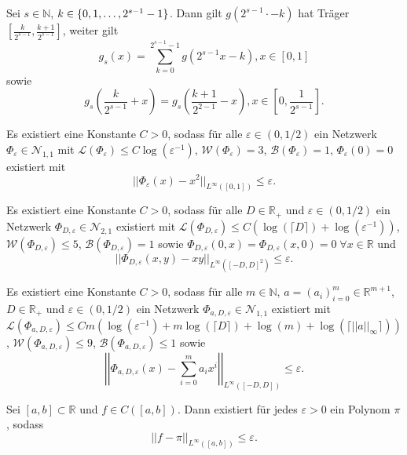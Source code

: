 \documentclass[11pt]{scrartcl}
\newcommand{\N}{\mathbb{N}} %
\newcommand{\R}{\mathbb{R}} %
\begin{document}
\begin{lemma}
	Sei \(s\in\N\), \(k \in \{0,1,\ldots, 2^{s-1}-1\}\). Dann gilt \(g(2^{s-1} \cdot - k)\) 
    hat Träger \([\frac{k}{2^{s-1}}, \frac{k+1}{2^{s-1}}]\), weiter gilt 
    \[ g_s(x) = \sum_{k=0}^{2^{s-1}-1} g(2^{s-1}x - k), x\in [0,1] \]
    sowie 
    \[ g_s(\frac{k}{2^{s-1}}+x) = g_s(\frac{k+1}{2^{2-1}} - x), x \in [0, \frac{1}{2^{s-1}}]. \]
\end{lemma}

\begin{proposition} %
	Es existiert eine Konstante \(C>0\), sodass für alle \(\varepsilon \in (0,1/2)\) 
	ein Netzwerk \(\Phi_\varepsilon \in \mathcal{N}_{1,1}\) mit 
	\(\mathcal{L}(\Phi_\varepsilon) \leq C\log(\varepsilon^{-1})\), 
	\(\mathcal{W}(\Phi_\varepsilon) = 3\), \(\mathcal{B}(\Phi_\varepsilon) = 1\), 
	\(\Phi_\varepsilon(0) = 0\) existiert mit 
	\[ ||\Phi_\varepsilon(x) - x^2 ||_{L^\infty([0,1])} \leq \varepsilon. \]
\end{proposition}

\begin{proposition} %
	Es existiert eine Konstante \(C>0\), sodass für alle \(D\in \R_+\) und \(\varepsilon \in (0, 1/2)\) 
	ein Netzwerk \(\Phi_{D,\varepsilon} \in \mathcal{N}_{2,1}\) existiert mit 
	\(\mathcal{L}(\Phi_{D, \varepsilon}) \leq C (\log(\lceil D \rceil) + \log(\varepsilon^{-1})) \), 
	\(\mathcal{W}(\Phi_{D, \varepsilon}) \leq 5\), \(\mathcal{B}(\Phi_{D, \varepsilon}) = 1\) sowie 
	\(\Phi_{D,\varepsilon}(0,x) = \Phi_{D,\varepsilon}(x,0) = 0 \;\forall x\in \R\) und 
	\[ ||\Phi_{D,\varepsilon}(x,y) - xy||_{L^\infty([-D,D]^2)} \leq \varepsilon. \]
\end{proposition}

\begin{proposition} %
	\newcommand{\Phia}{\Phi_{a,D,\varepsilon}}
	Es existiert eine Konstante \(C>0\), sodass für alle \(m\in \N\), \(a = (a_i)_{i=0}^m \in \R^{m+1}\), 
	\(D\in \R_+\) und \(\varepsilon \in (0,1/2)\) ein Netzwerk \(\Phia \in \mathcal{N}_{1,1}\) 
	existiert mit \(\mathcal{L}(\Phia) \leq C m (\log(\varepsilon^{-1}) + m\log(\lceil D \rceil) + \log(m) + \log(\lceil ||a||_\infty \rceil))\), 
	\(\mathcal{W}(\Phia) \leq 9\), \(\mathcal{B}(\Phia) \leq 1\) sowie 
	\[ \left|\left|\Phia(x) - \sum_{i=0}^m a_i x^i \right|\right|_{L^\infty([-D,D])} \leq \varepsilon. \]
\end{proposition}

\begin{theorem} %
	Sei \([a,b] \subset \R\) und \(f\in C([a,b])\). Dann existiert für jedes \(\varepsilon > 0\) ein 
	Polynom \(\pi\), sodass 
	\[ ||f - \pi ||_{L^\infty([a,b])} \leq \varepsilon. \]
\end{theorem}
\end{document}
